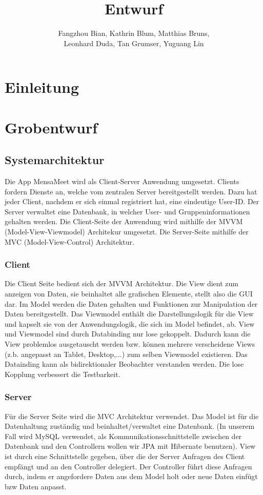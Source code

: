 \documentclass[a4paper]{scrreprt}
\begin{document}
\title{Entwurf}
\author{Fangzhou Bian, Kathrin Blum, Matthias Bruns, \\Leonhard Duda, Tan Grumser, Yuguang Lin}
\maketitle
\tableofcontents



\chapter{Einleitung}

\chapter{Grobentwurf}
\section{Systemarchitektur}
Die App MensaMeet wird als Client-Server Anwendung umgesetzt. Clients fordern Dienste an, welche vom zentralen Server bereitgestellt werden. Dazu hat jeder Client, nachdem er sich einmal registriert hat, eine eindeutige User-ID. Der Server verwaltet eine Datenbank, in welcher User- und Gruppeninformationen gehalten werden. 
Die Client-Seite der Anwendung wird mithilfe der MVVM (Model-View-Viewmodel) Architekur umgesetzt.
Die Server-Seite mithilfe der MVC (Model-View-Control) Architektur.

\subsection{Client}
Die Client Seite bedient sich der MVVM Architektur. Die View dient zum anzeigen von Daten, sie beinhaltet alle grafischen Elemente, stellt also die GUI dar. Im Model werden die Daten gehalten und Funktionen zur Manipulation der Daten bereitgestellt.
Das Viewmodel enthält die Darstellungslogik für die View und kapselt sie von der Anwendungslogik, die sich im Model befindet, ab.
View und Viewmodel sind durch Databinding nur lose gekoppelt. Dadurch kann die View problemlos ausgetauscht werden bzw. können mehrere verscheidene Views (z.b. angepasst an Tablet, Desktop,...) zum selben Viewmodel existieren.
Das Datainding kann als bidirektionaler Beobachter verstanden werden. Die lose Kopplung verbessert die Testbarkeit.

\subsection{Server}
Für die Server Seite wird die MVC Architektur verwendet.
Das Model ist für die Datenhaltung zuständig und beinhaltet/verwaltet eine Datenbank.  (In unserem Fall wird MySQL verwendet, als Kommunikationsschnittstelle zwischen der Datenbank und den Controllern wollen wir JPA mit Hibernate benutzen).
View ist durch eine Schnittstelle gegeben, über die der Server Anfragen des Client empfängt und an den Controller delegiert. Der Controller führt diese Anfragen durch, indem er angefordere Daten aus dem Model holt oder neue Daten einfügt bzw Daten anpasst.
\end{document}
